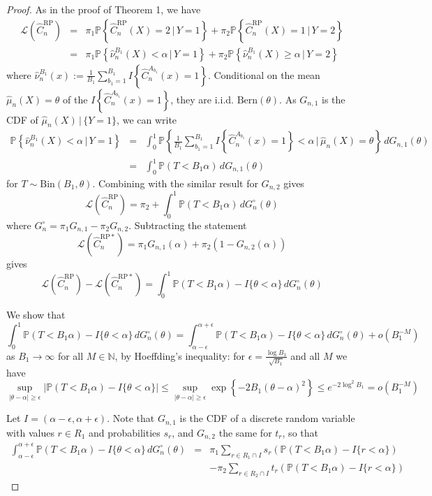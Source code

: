 \documentclass{amsart}
\newcommand\crpnhat{\hat{C}_{n}^{\mathrm{RP}}}
\newcommand\crpnhatstar{\hat{C}_{n}^{\mathrm{RP*}}}
\newcommand\risk{\mathcal{L}}
\begin{document}
\begin{proof}
As in the proof of Theorem 1, we have 
\begin{eqnarray*}
\risk(\crpnhat) & = & \pi_{1}\mathbb{P}\left\{ \crpnhat(X)=2\,|\,Y=1\right\} +\pi_{2}\mathbb{P}\left\{ \crpnhat(X)=1\,|\,Y=2\right\} \\
 & = & \pi_{1}\mathbb{P}\left\{ \hat{\nu}_{n}^{B_{1}}(X)<\alpha\,|\,Y=1\right\} +\pi_{2}\mathbb{P}\left\{ \hat{\nu}_{n}^{B_{1}}(X)\geq\alpha\,|\,Y=2\right\} 
\end{eqnarray*}
 where $\hat{\nu}_{n}^{B_{1}}(x):=\frac{1}{B_{1}}\sum_{b_{1}=1}^{B_{1}}I\left\{ \hat{C}_{n}^{A_{b_{1}}}(x)=1\right\} $.
Conditional on the mean $\hat{\mu}_{n}(X)=\theta$ of the $I\left\{ \hat{C}_{n}^{A_{b_{1}}}(x)=1\right\} $,
they are i.i.d. $\mathrm{Bern}(\theta)$. As $G_{n,1}$ is the CDF
of $\hat{\mu}_{n}(X)\,|\,\{Y=1\}$, we can write 
\begin{eqnarray*}
\mathbb{P}\left\{ \hat{\nu}_{n}^{B_{1}}(X)<\alpha\,|\,Y=1\right\}  & = & \int_{0}^{1}\!\mathbb{P}\left\{ \frac{1}{B_{1}}\sum_{b_{1}=1}^{B_{1}}I\left\{ \hat{C}_{n}^{A_{b_{1}}}(x)=1\right\} <\alpha\,\bigg|\,\hat{\mu}_{n}(X)=\theta\right\} \,dG_{n,1}(\theta)\\
 & = & \int_{0}^{1}\!\mathbb{P}(T<B_{1}\alpha)\,dG_{n,1}(\theta)
\end{eqnarray*}
 for $T\sim\mathrm{Bin}(B_{1},\theta)$. Combining with the similar
result for $G_{n,2}$ gives 
\[
\risk(\crpnhat)=\pi_{2}+\int_{0}^{1}\!\mathbb{P}(T<B_{1}\alpha)\,dG_{n}^{\circ}(\theta)
\]
 where $G_{n}^{\circ}=\pi_{1}G_{n,1}-\pi_{2}G_{n,2}$. Subtracting the statement 
\[
\risk\left(\crpnhatstar\right)=\pi_{1}G_{n,1}(\alpha)+\pi_{2}\left(1-G_{n,2}(\alpha)\right)
\]
 gives 
\[
\risk\left(\crpnhat\right)-\risk\left(\crpnhatstar\right)=\int_{0}^{1}\!\mathbb{P}(T<B_{1}\alpha)-I\{\theta<\alpha\}\,dG_{n}^{\circ}(\theta)
\]


We show that 
\[
\int_{0}^{1}\!\mathbb{P}(T<B_{1}\alpha)-I\{\theta<\alpha\}\,dG_{n}^{\circ}(\theta)=\int_{\alpha-\epsilon}^{\alpha+\epsilon}\!\mathbb{P}(T<B_{1}\alpha)-I\{\theta<\alpha\}\,dG_{n}^{\circ}(\theta)+o(B_{1}^{-M})
\]
 as $B_{1}\to\infty$ for all $M\in\mathbb{N}$, by Hoeffding's inequality:
for $\epsilon=\frac{\log B_{1}}{\sqrt{B_{1}}}$ and all $M$ we have
\[
\sup_{|\theta-\alpha|\geq\epsilon}\left|\mathbb{P}(T<B_{1}\alpha)-I\{\theta<\alpha\}\right|\leq\sup_{|\theta-\alpha|\geq\epsilon}\exp\left\{ -2B_{1}(\theta-\alpha)^{2}\right\} \leq e^{-2\log^{2}B_{1}}=o(B_{1}^{-M})
\]


Let $I=(\alpha-\epsilon,\alpha+\epsilon)$. Note that $G_{n,1}$ is
the CDF of a discrete random variable with values $r\in R_{1}$ and
probabilities $s_{r}$, and $G_{n,2}$ the same for $t_r$, so that 
\begin{eqnarray*}
\int_{\alpha-\epsilon}^{\alpha+\epsilon}\!\mathbb{P}(T<B_{1}\alpha)-I\{\theta<\alpha\}\,dG_{n}^{\circ}(\theta) & = & \pi_{1}\sum_{r\in R_{1}\cap I}s_{r}\left(\mathbb{P}(T<B_{1}\alpha)-I\{r<\alpha\}\right)\\
 &  & -\pi_{2}\sum_{r\in R_{2}\cap I}t_{r}\left(\mathbb{P}(T<B_{1}\alpha)-I\{r<\alpha\}\right)
\end{eqnarray*}



\end{proof}
\end{document}
